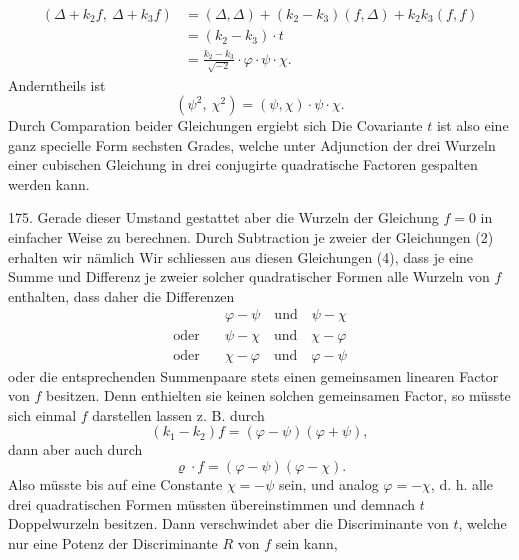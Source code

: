 \[
\begin{aligned}
(\Delta+k_2f,\ \Delta+k_3f) &= (\Delta,\Delta)+(k_2-k_3)(f,\Delta)+k_2k_3(f,f) \\
&= (k_2-k_3)\cdot t \\
&= \frac{k_2-k_3}{\sqrt{-2}} \cdot \varphi \cdot \psi \cdot \chi.
\end{aligned}
\]
Anderntheils ist
\[
(\psi^2,\ \chi^2) = (\psi,\chi)\cdot\psi\cdot\chi.
\]
Durch Comparation beider Gleichungen ergiebt sich
Die Covariante $t$ ist also eine ganz specielle Form sechsten Grades, welche unter Adjunction der drei Wurzeln einer cubischen Gleichung in drei conjugirte quadratische Factoren gespalten werden kann.

175. Gerade dieser Umstand gestattet aber die Wurzeln der Gleichung $f=0$ in einfacher Weise zu berechnen. Durch Subtraction je zweier der Gleichungen (2) erhalten wir nämlich
Wir schliessen aus diesen Gleichungen (4), dass je eine Summe und Differenz je zweier solcher quadratischer Formen alle Wurzeln von $f$ enthalten, dass daher die Differenzen
\[
\begin{aligned}
&\varphi-\psi \quad \text{und} \quad \psi-\chi \\
\text{oder}\quad &\psi-\chi \quad \text{und} \quad \chi-\varphi \\
\text{oder}\quad &\chi-\varphi \quad \text{und} \quad \varphi-\psi
\end{aligned}
\]
oder die entsprechenden Summenpaare stets einen gemeinsamen linearen Factor von $f$ besitzen. Denn enthielten sie keinen solchen gemeinsamen Factor, so müsste sich einmal $f$ darstellen lassen z. B. durch
\[
(k_1-k_2)f = (\varphi-\psi)(\varphi+\psi),
\]
dann aber auch durch
\[
\varrho \cdot f = (\varphi-\psi)(\varphi-\chi).
\]
Also müsste bis auf eine Constante $\chi = -\psi$ sein, und analog $\varphi = -\chi$, d. h. alle drei quadratischen Formen müssten übereinstimmen und demnach $t$ Doppelwurzeln besitzen. Dann verschwindet aber die Discriminante von $t$, welche nur eine Potenz der Discriminante $R$ von $f$ sein kann,


